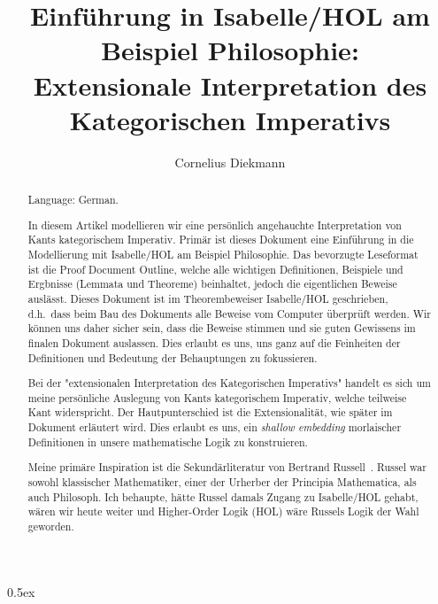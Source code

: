 \documentclass[11pt,a4paper]{article}
\begin{document}
\title{Einführung in Isabelle/HOL am Beispiel Philosophie:\\
Extensionale Interpretation des Kategorischen Imperativs}
\author{Cornelius Diekmann}
\maketitle

\begin{abstract}

Language: German.

\medskip

In diesem Artikel modellieren wir eine persönlich angehauchte
Interpretation von Kants kategorischem Imperativ.
Primär ist dieses Dokument eine Einführung in die Modellierung mit Isabelle/HOL
am Beispiel Philosophie.
Das bevorzugte Leseformat ist die Proof Document Outline,
welche alle wichtigen Definitionen, Beispiele und Ergbnisse (Lemmata und Theoreme) beinhaltet,
jedoch die eigentlichen Beweise auslässt.
Dieses Dokument ist im Theorembeweiser Isabelle/HOL geschrieben,
d.h.\ dass beim Bau des Dokuments alle Beweise vom Computer überprüft werden.
Wir können uns daher sicher sein, dass die Beweise stimmen
und sie guten Gewissens im finalen Dokument auslassen.
Dies erlaubt es uns, uns ganz auf die Feinheiten der Definitionen
und Bedeutung der Behauptungen zu fokussieren.


Bei der "extensionalen Interpretation des Kategorischen Imperativs" handelt es sich
um meine persönliche Auslegung von Kants kategorischem Imperativ,
welche teilweise Kant widerspricht.
Der Hautpunterschied ist die Extensionalität, wie später im Dokument erläutert wird.
Dies erlaubt es uns, ein \emph{shallow embedding} morlaischer Definitionen in
unsere mathematische Logik zu konstruieren.

Meine primäre Inspiration ist die Sekundärliteratur von Bertrand Russell~\cite{russellphi}.
Russel war sowohl klassischer Mathematiker, einer der Urherber der Principia Mathematica,
als auch Philosoph.
Ich behaupte, hätte Russel damals Zugang zu Isabelle/HOL gehabt, wären wir heute weiter
und Higher-Order Logik (HOL) wäre Russels Logik der Wahl geworden.
\end{abstract}

%
%

\tableofcontents

\parindent 0pt\parskip 0.5ex





\end{document}
